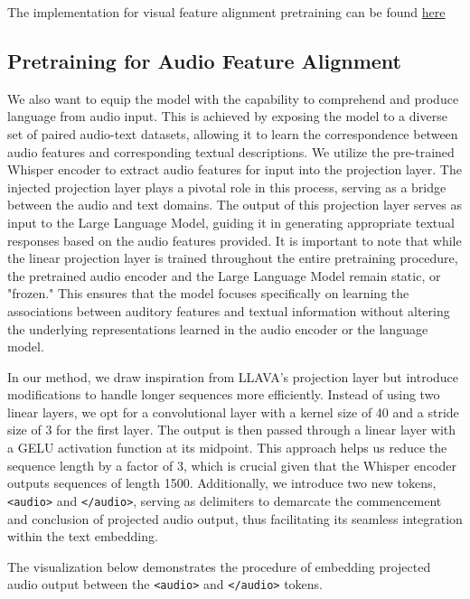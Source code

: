 \documentclass[preprint]{article}
\begin{document}
The implementation for visual feature alignment pretraining can be found \href{https://github.com/mesolitica/multimodal-LLM/tree/master/vision-only}{here}

\subsection{Pretraining for Audio Feature Alignment}

We also want to equip the model with the capability to comprehend and produce language from audio input. This is achieved by exposing the model to a diverse set of paired audio-text datasets, allowing it to learn the correspondence between audio features and corresponding textual descriptions. We utilize the pre-trained Whisper encoder to extract audio features for input into the projection layer. The injected projection layer plays a pivotal role in this process, serving as a bridge between the audio and text domains. The output of this projection layer serves as input to the Large Language Model, guiding it in generating appropriate textual responses based on the audio features provided. It is important to note that while the linear projection layer is trained throughout the entire pretraining procedure, the pretrained audio encoder and the Large Language Model remain static, or "frozen." This ensures that the model focuses specifically on learning the associations between auditory features and textual information without altering the underlying representations learned in the audio encoder or the language model.

In our method, we draw inspiration from LLAVA's projection layer but introduce modifications to handle longer sequences more efficiently. Instead of using two linear layers, we opt for a convolutional layer with a kernel size of 40 and a stride size of 3 for the first layer. The output is then passed through a linear layer with a GELU activation function at its midpoint. This approach helps us reduce the sequence length by a factor of 3, which is crucial given that the Whisper encoder outputs sequences of length 1500. Additionally, we introduce two new tokens, \texttt{<audio>} and \texttt{</audio>}, serving as delimiters to demarcate the commencement and conclusion of projected audio output, thus facilitating its seamless integration within the text embedding.

The visualization below demonstrates the procedure of embedding projected audio output between the \texttt{<audio>} and \texttt{</audio>} tokens.
\end{document}
